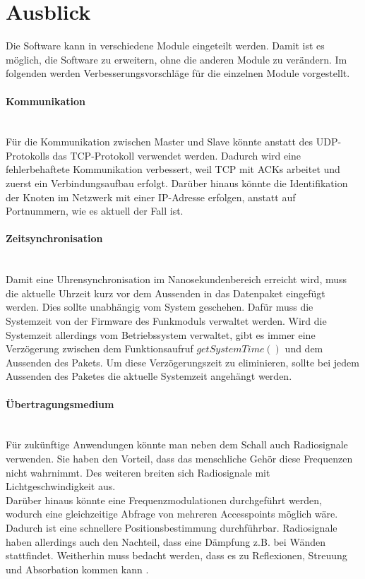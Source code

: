 \newpage

\section{Ausblick}
Die Software kann in verschiedene Module eingeteilt werden. Damit ist es möglich, die Software zu erweitern, ohne die anderen Module zu verändern. Im folgenden werden Verbesserungsvorschläge für die einzelnen Module vorgestellt.

\paragraph{Kommunikation}\mbox{}\\
Für die Kommunikation zwischen Master und Slave könnte anstatt des UDP-Protokolls das TCP-Protokoll verwendet werden. Dadurch wird eine fehlerbehaftete Kommunikation verbessert, weil TCP mit ACKs arbeitet und zuerst ein Verbindungsaufbau erfolgt. Darüber hinaus könnte die Identifikation der Knoten im Netzwerk mit einer IP-Adresse erfolgen, anstatt auf Portnummern, wie es aktuell der Fall ist.

\paragraph{Zeitsynchronisation}\mbox{}\\
Damit eine Uhrensynchronisation im Nanosekundenbereich erreicht wird, muss die aktuelle Uhrzeit kurz vor dem Aussenden in das Datenpaket eingefügt werden. Dies sollte unabhängig vom System geschehen. Dafür muss die Systemzeit von der Firmware des Funkmoduls verwaltet werden. Wird die Systemzeit allerdings vom Betriebssystem verwaltet, gibt es immer eine Verzögerung zwischen dem Funktionsaufruf $getSystemTime()$ und dem Aussenden des Pakets. Um diese Verzögerungszeit zu eliminieren, sollte bei jedem Aussenden des Paketes die aktuelle Systemzeit angehängt werden.

\paragraph{Übertragungsmedium}\mbox{}\\
Für zukünftige Anwendungen könnte man neben dem Schall auch Radiosignale verwenden. Sie haben den Vorteil, dass das menschliche Gehör diese Frequenzen nicht wahrnimmt. Des weiteren breiten sich Radiosignale mit Lichtgeschwindigkeit aus.
\\
Darüber hinaus könnte eine Frequenzmodulationen durchgeführt werden, wodurch eine gleichzeitige Abfrage von mehreren Accesspoints möglich wäre. Dadurch ist eine schnellere Positionsbestimmung durchführbar. Radiosignale haben allerdings auch den Nachteil, dass eine Dämpfung z.B. bei Wänden stattfindet. Weitherhin muss bedacht werden, dass es zu Reflexionen, Streuung und Absorbation kommen kann \cite{src_RADIOSIGNALE}.

